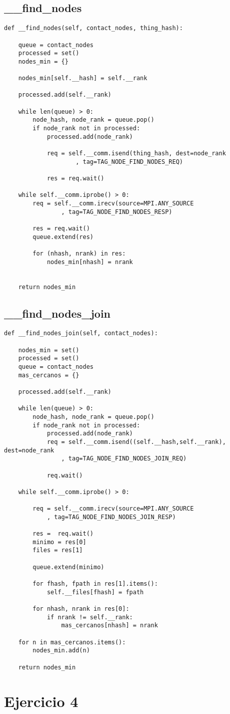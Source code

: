 \subsection{\_\_find\_nodes}
\begin{lstlisting}
def __find_nodes(self, contact_nodes, thing_hash):

    queue = contact_nodes
    processed = set()
    nodes_min = {}

    nodes_min[self.__hash] = self.__rank

    processed.add(self.__rank)

    while len(queue) > 0:
        node_hash, node_rank = queue.pop()
        if node_rank not in processed:
            processed.add(node_rank)

            req = self.__comm.isend(thing_hash, dest=node_rank
					, tag=TAG_NODE_FIND_NODES_REQ)

            res = req.wait()

    while self.__comm.iprobe() > 0:
        req = self.__comm.irecv(source=MPI.ANY_SOURCE
				, tag=TAG_NODE_FIND_NODES_RESP)

        res = req.wait()
        queue.extend(res)

        for (nhash, nrank) in res:
            nodes_min[nhash] = nrank


    return nodes_min
\end{lstlisting}

\subsection{\_\_find\_nodes\_join}
\begin{lstlisting}
def __find_nodes_join(self, contact_nodes):

    nodes_min = set()
    processed = set()
    queue = contact_nodes
    mas_cercanos = {}

    processed.add(self.__rank)
                
    while len(queue) > 0:
        node_hash, node_rank = queue.pop()                                 
        if node_rank not in processed:
            processed.add(node_rank)
            req = self.__comm.isend((self.__hash,self.__rank), dest=node_rank
				, tag=TAG_NODE_FIND_NODES_JOIN_REQ)

            req.wait()

    while self.__comm.iprobe() > 0:

        req = self.__comm.irecv(source=MPI.ANY_SOURCE
			, tag=TAG_NODE_FIND_NODES_JOIN_RESP)

        res =  req.wait()
        minimo = res[0]
        files = res[1]

        queue.extend(minimo)

        for fhash, fpath in res[1].items():
            self.__files[fhash] = fpath

        for nhash, nrank in res[0]:
            if nrank != self.__rank:
                mas_cercanos[nhash] = nrank

    for n in mas_cercanos.items():
        nodes_min.add(n)

    return nodes_min
\end{lstlisting}

\section{Ejercicio 4}

